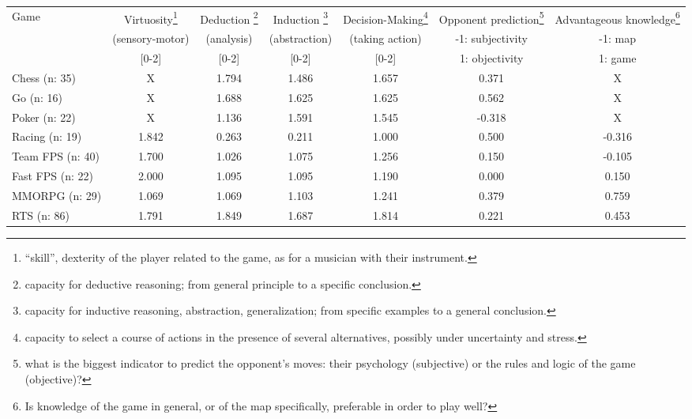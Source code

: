 \begin{table}

\begin{tabular}{|l|cccccc|}                                                     
\hline                                                                          
Game & Virtuosity\footnote{``skill'', dexterity of the player related to the game, as for a musician with their instrument.} & Deduction \footnote{capacity for deductive reasoning; from general principle to a specific conclusion.} & Induction \footnote{capacity for inductive reasoning, abstraction, generalization; from specific examples to a general conclusion.} & Decision-Making\footnote{capacity to select a course of actions in the presence of several alternatives, possibly under uncertainty and stress.} & Opponent prediction\footnote{what is the biggest indicator to predict the opponent's moves: their psychology (subjective) or the rules and logic of the game (objective)?} & Advantageous knowledge\footnote{Is knowledge of the game in general, or of the map specifically, preferable in order to play well?} \\
 & (sensory-motor) & (analysis) & (abstraction) & (taking action) & -1: subjectivity & -1: map \\
 & [0-2] & [0-2] & [0-2] & [0-2] & 1: objectivity & 1: game \\
\hline                                                                     
Chess (n: 35) &  X  & 1.794 & 1.486 & 1.657 & 0.371 &  X  \\                
Go (n: 16) &  X  & 1.688 & 1.625 & 1.625 & 0.562 &  X  \\                   
Poker (n: 22) &  X  & 1.136 & 1.591 & 1.545 & -0.318 &  X  \\               
Racing (n: 19) & 1.842 & 0.263 & 0.211 & 1.000 & 0.500 & -0.316 \\         
Team FPS (n: 40) & 1.700 & 1.026 & 1.075 & 1.256 & 0.150 & -0.105 \\     
Fast FPS (n: 22) & 2.000 & 1.095 & 1.095 & 1.190 & 0.000 & 0.150 \\           
MMORPG (n: 29) & 1.069 & 1.069 & 1.103 & 1.241 & 0.379 & 0.759 \\           
RTS (n: 86) & 1.791 & 1.849 & 1.687 & 1.814 & 0.221 & 0.453 \\           
\hline
\end{tabular}
\label{surveygamers}
\end{table}


